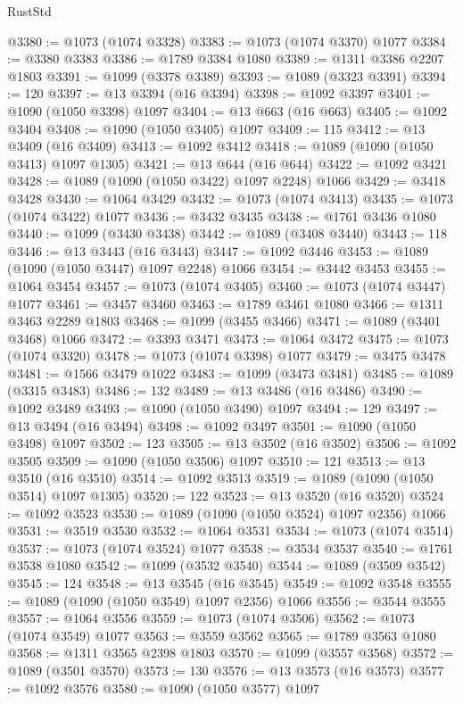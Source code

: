 \begin{lexlean}{RustStd}
\begin{coremodule}
@3380 := @1073 (@1074 @3328)
@3383 := @1073 (@1074 @3370) @1077
@3384 := @3380 @3383
@3386 := @1789 @3384 @1080
@3389 := @1311 @3386 @2207 @1803
@3391 := @1099 (@3378 @3389)
@3393 := @1089 (@3323 @3391)
@3394 := 120
@3397 := @13 @3394 (@16 @3394)
@3398 := @1092 @3397
@3401 := @1090 (@1050 @3398) @1097
@3404 := @13 @663 (@16 @663)
@3405 := @1092 @3404
@3408 := @1090 (@1050 @3405) @1097
@3409 := 115
@3412 := @13 @3409 (@16 @3409)
@3413 := @1092 @3412
@3418 := @1089 (@1090 (@1050 @3413) @1097 @1305)
@3421 := @13 @644 (@16 @644)
@3422 := @1092 @3421
@3428 := @1089 (@1090 (@1050 @3422) @1097 @2248) @1066
@3429 := @3418 @3428
@3430 := @1064 @3429
@3432 := @1073 (@1074 @3413)
@3435 := @1073 (@1074 @3422) @1077
@3436 := @3432 @3435
@3438 := @1761 @3436 @1080
@3440 := @1099 (@3430 @3438)
@3442 := @1089 (@3408 @3440)
@3443 := 118
@3446 := @13 @3443 (@16 @3443)
@3447 := @1092 @3446
@3453 := @1089 (@1090 (@1050 @3447) @1097 @2248) @1066
@3454 := @3442 @3453
@3455 := @1064 @3454
@3457 := @1073 (@1074 @3405)
@3460 := @1073 (@1074 @3447) @1077
@3461 := @3457 @3460
@3463 := @1789 @3461 @1080
@3466 := @1311 @3463 @2289 @1803
@3468 := @1099 (@3455 @3466)
@3471 := @1089 (@3401 @3468) @1066
@3472 := @3393 @3471
@3473 := @1064 @3472
@3475 := @1073 (@1074 @3320)
@3478 := @1073 (@1074 @3398) @1077
@3479 := @3475 @3478
@3481 := @1566 @3479 @1022
@3483 := @1099 (@3473 @3481)
@3485 := @1089 (@3315 @3483)
@3486 := 132
@3489 := @13 @3486 (@16 @3486)
@3490 := @1092 @3489
@3493 := @1090 (@1050 @3490) @1097
@3494 := 129
@3497 := @13 @3494 (@16 @3494)
@3498 := @1092 @3497
@3501 := @1090 (@1050 @3498) @1097
@3502 := 123
@3505 := @13 @3502 (@16 @3502)
@3506 := @1092 @3505
@3509 := @1090 (@1050 @3506) @1097
@3510 := 121
@3513 := @13 @3510 (@16 @3510)
@3514 := @1092 @3513
@3519 := @1089 (@1090 (@1050 @3514) @1097 @1305)
@3520 := 122
@3523 := @13 @3520 (@16 @3520)
@3524 := @1092 @3523
@3530 := @1089 (@1090 (@1050 @3524) @1097 @2356) @1066
@3531 := @3519 @3530
@3532 := @1064 @3531
@3534 := @1073 (@1074 @3514)
@3537 := @1073 (@1074 @3524) @1077
@3538 := @3534 @3537
@3540 := @1761 @3538 @1080
@3542 := @1099 (@3532 @3540)
@3544 := @1089 (@3509 @3542)
@3545 := 124
@3548 := @13 @3545 (@16 @3545)
@3549 := @1092 @3548
@3555 := @1089 (@1090 (@1050 @3549) @1097 @2356) @1066
@3556 := @3544 @3555
@3557 := @1064 @3556
@3559 := @1073 (@1074 @3506)
@3562 := @1073 (@1074 @3549) @1077
@3563 := @3559 @3562
@3565 := @1789 @3563 @1080
@3568 := @1311 @3565 @2398 @1803
@3570 := @1099 (@3557 @3568)
@3572 := @1089 (@3501 @3570)
@3573 := 130
@3576 := @13 @3573 (@16 @3573)
@3577 := @1092 @3576
@3580 := @1090 (@1050 @3577) @1097

\end{coremodule}
\end{lexlean}
